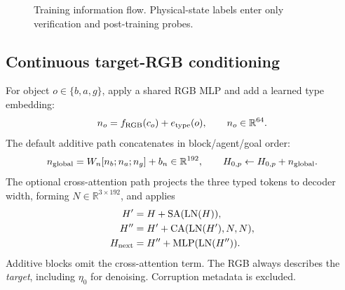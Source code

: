\documentclass[11pt,a4paper]{article}
\newcommand{\R}{\mathbb{R}}
\begin{document}
\begin{figure}[htbp]\centering
{}
\caption{Training information flow. Physical-state labels enter only verification and post-training probes.}
\end{figure}

\subsection{Continuous target-RGB conditioning}
For object $o\in\{b,a,g\}$, apply a shared RGB MLP and add a learned type embedding:
\begin{equation}
n_o=f_{\rm RGB}(c_o)+e_{\rm type}(o),\qquad n_o\in\R^{64}.
\end{equation}
The default additive path concatenates in block/agent/goal order:
\begin{equation}
n_{\rm global}=W_n[n_b;n_a;n_g]+b_n\in\R^{192},\qquad
H_{0,p}\leftarrow H_{0,p}+n_{\rm global}.
\end{equation}
The optional cross-attention path projects the three typed tokens to decoder width,
forming $N\in\R^{3\times192}$, and applies
\begin{align}
H'&=H+\operatorname{SA}(\operatorname{LN}(H)),\\
H''&=H'+\operatorname{CA}(\operatorname{LN}(H'),N,N),\\
H_{\rm next}&=H''+\operatorname{MLP}(\operatorname{LN}(H'')).
\end{align}
Additive blocks omit the cross-attention term. The RGB always describes the
\emph{target}, including $\eta_0$ for denoising. Corruption metadata is excluded.
\end{document}

